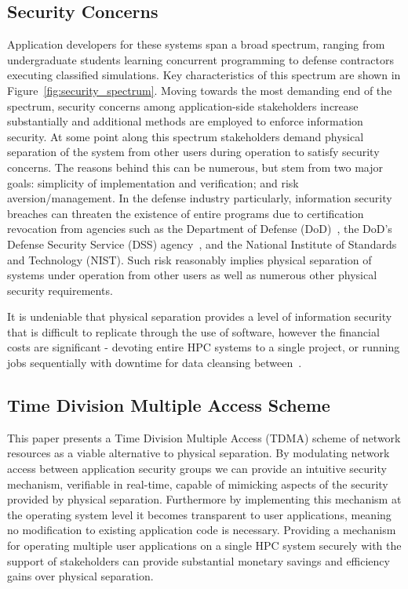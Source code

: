\documentclass[oneside,12pt]{memoir}
\begin{document}
\subsection{Security Concerns}
Application developers for these systems span a broad spectrum, ranging from undergraduate students learning concurrent programming to defense contractors executing classified simulations. Key characteristics of this spectrum are shown in Figure~\ref{fig:security_spectrum}. Moving towards the most demanding end of the spectrum, security concerns among application-side stakeholders increase substantially and additional methods are employed to enforce information security. At some point along this spectrum stakeholders demand physical separation of the system from other users during operation to satisfy security concerns. The reasons behind this can be numerous, but stem from two major goals: simplicity of implementation and verification; and risk aversion/management. In the defense industry particularly, information security breaches can threaten the existence of entire programs due to certification revocation from agencies such as the Department of Defense (DoD)~\cite{classified_manual}, the DoD's Defense Security Service (DSS) agency~\cite{updatedclearing}, and the National Institute of Standards and Technology (NIST). Such risk reasonably implies physical separation of systems under operation from other users as well as numerous other physical security requirements. 

It is undeniable that physical separation provides a level of information security that is difficult to replicate through the use of software, however the financial costs are significant - devoting entire HPC systems to a single project, or running jobs sequentially with downtime for data cleansing between~\cite{updatedclearing}. 

\subsection{Time Division Multiple Access Scheme}
This paper presents a Time Division Multiple Access (TDMA) scheme of network resources as a viable alternative to physical separation. By modulating network access between application security groups we can provide an intuitive security mechanism, verifiable in real-time, capable of mimicking aspects of the security provided by physical separation. Furthermore by implementing this mechanism at the operating system level it becomes transparent to user applications, meaning no modification to existing application code is necessary. Providing a mechanism for operating multiple user applications on a single HPC system securely with the support of stakeholders can provide substantial monetary savings and efficiency gains over physical separation.
\end{document}
